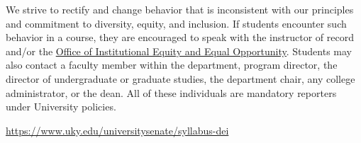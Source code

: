 \documentclass[
  letterpaper,
  DIV=11,
  numbers=noendperiod]{scrartcl}
\begin{document}
We strive to rectify and change behavior that is inconsistent with our
principles and commitment to diversity, equity, and inclusion. If
students encounter such behavior in a course, they are encouraged to
speak with the instructor of record and/or the
\href{https://www.uky.edu/eeo/}{\uline{Office of Institutional Equity
and Equal Opportunity}}. Students may also contact a faculty member
within the department, program director, the director of undergraduate
or graduate studies, the department chair, any college administrator, or
the dean. All of these individuals are mandatory reporters under
University policies.

\url{https://www.uky.edu/universitysenate/syllabus-dei}
\end{document}
